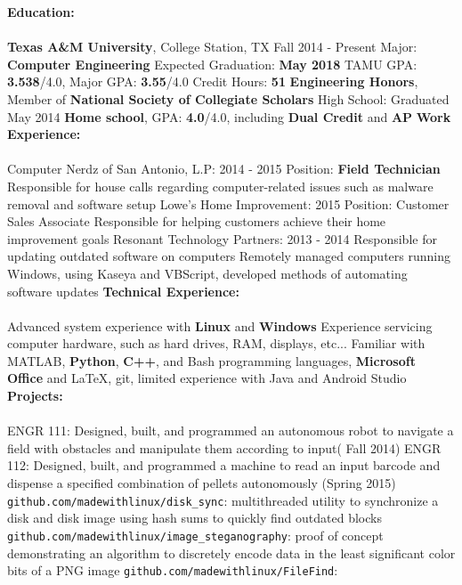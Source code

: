 \documentclass[12pt]{article}
\newcommand{\upspace}{\vspace{0px}}
\newcommand{\zzz}[1]{\upspace \0 \textbf{#1} \\ \vspace{-0.7\baselineskip} \hrulefill \vspace{-2px} \\ }
\newcommand{\aaa}{\upspace \1}
\newcommand{\bbb}{\upspace \2}
\begin{document}
\begin{flushleft}
\begin{outline}[compactitem]
\zzz{Education:}
	\aaa \textbf{Texas A\&M University}, College Station, TX \hfill Fall 2014 - Present
		\bbb Major: \textbf{Computer Engineering}
		\bbb Expected Graduation: \textbf{May 2018}
		\bbb TAMU GPA: \textbf{3.538}/4.0, Major GPA: \textbf{3.55}/4.0
		\bbb Credit Hours: \textbf{51}
		\bbb \textbf{Engineering Honors}, Member of \textbf{National Society of Collegiate Scholars}
	\aaa High School: \hfill Graduated May 2014
		\bbb \textbf{Home school}, GPA: \textbf{4.0}/4.0, including \textbf{Dual Credit} and \textbf{AP}
\zzz{Work Experience:}
	\aaa Computer Nerdz of San Antonio, L.P: \hfill 2014 - 2015
		\bbb Position: \textbf{Field Technician}
		\bbb Responsible for house calls regarding computer-related issues such as malware removal and software setup
	\aaa Lowe's Home Improvement: \hfill 2015
		\bbb Position: Customer Sales Associate
		\bbb Responsible for helping customers achieve their home improvement goals
	\aaa Resonant Technology Partners: \hfill 2013 - 2014
		\bbb Responsible for updating outdated software on computers
		\bbb Remotely managed computers running Windows, using Kaseya and VBScript, developed methods of automating software updates
\zzz{Technical Experience:}
	\aaa Advanced system experience with \textbf{Linux} and \textbf{Windows}
	\aaa Experience servicing computer hardware, such as hard drives, RAM, displays, etc...
	\aaa Familiar with MATLAB, \textbf{Python}, \textbf{C++}, and Bash programming languages, \textbf{Microsoft Office} and LaTeX, git, limited experience with Java and Android Studio
\zzz{Projects:}
	\aaa ENGR 111: Designed, built, and programmed an autonomous robot to navigate a field with obstacles and manipulate them according to input( Fall 2014)
	\aaa ENGR 112: Designed, built, and programmed a machine to read an input barcode and dispense a specified combination of pellets autonomously (Spring 2015)
	\aaa \verb|github.com/madewithlinux/disk_sync|: 
		multithreaded utility to synchronize a disk and disk image using hash sums to quickly find outdated blocks
	\aaa \verb|github.com/madewithlinux/image_steganography|:
		proof of concept demonstrating an algorithm to discretely encode data in the least significant color bits of a PNG image
	\aaa \verb|github.com/madewithlinux/FileFind|:

\end{outline}
\end{flushleft}
\end{document}
